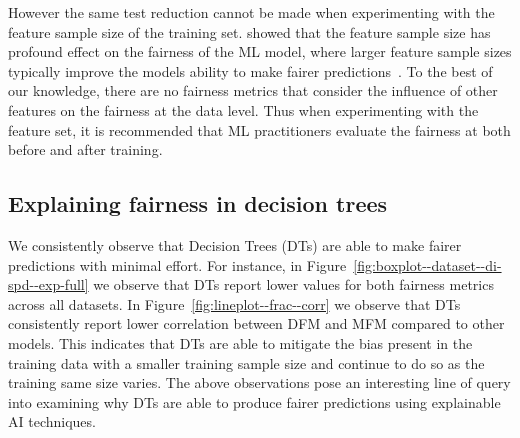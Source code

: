\documentclass{article}
\begin{document}




However the same test reduction cannot be made when experimenting with
the feature sample size of the training
set. \citeauthor{zhang2021ignorance} showed that the feature sample
size has profound effect on the fairness of the ML model, where larger
feature sample sizes typically improve the models ability to make
fairer predictions \cite{zhang2021ignorance}. To the best of our
knowledge, there are no fairness metrics that consider the influence
of other features on the fairness at the data level. Thus when
experimenting with the feature set, it is recommended that ML
practitioners evaluate the fairness at both before and after training.

\subsection{Explaining fairness in decision trees}\label{sec:discuss-explain-fair-dt}

We consistently observe that Decision Trees (DTs) are able to make
fairer predictions with minimal effort. For instance, in
Figure \ref{fig:boxplot--dataset--di-spd--exp-full} we observe that
DTs report lower values for both fairness metrics across all
datasets. In Figure \ref{fig:lineplot--frac--corr} we observe that DTs
consistently report lower correlation between DFM and MFM compared to
other models. This indicates that DTs are able to mitigate the bias
present in the training data with a smaller training sample size and
continue to do so as the training same size varies. The above
observations pose an interesting line of query into examining why DTs
are able to produce fairer predictions using explainable AI
techniques.
\end{document}
